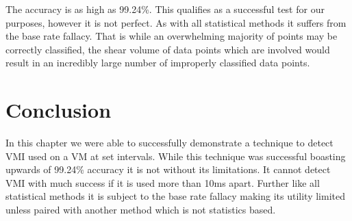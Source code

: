 The accuracy is as high as 99.24\%. This qualifies as a successful test for our purposes, however it is not perfect. As with all statistical methods it suffers from the base rate fallacy. That is while an overwhelming majority of points may be correctly classified, the shear volume of data points which are involved would result in an incredibly large number of improperly classified data points. 

\section{Conclusion}
In this chapter we were able to successfully demonstrate a technique to detect VMI used on a VM at set intervals. While this technique was successful boasting upwards of 99.24\% accuracy it is not without its limitations. It cannot detect VMI with much success if it is used more than 10ms apart. Further like all statistical methods it is subject to the base rate fallacy making its utility limited unless paired with another method which is not statistics based. 